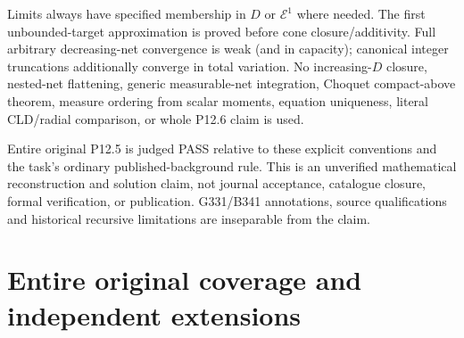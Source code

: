 \documentclass[
]{article}
\begin{document}
Limits always have specified membership in \(D\) or \(\mathcal E^1\)
where needed. The first unbounded-target approximation is proved before
cone closure/additivity. Full arbitrary decreasing-net convergence is
weak (and in capacity); canonical integer truncations additionally
converge in total variation. No increasing-\(D\) closure, nested-net
flattening, generic measurable-net integration, Choquet compact-above
theorem, measure ordering from scalar moments, equation uniqueness,
literal CLD/radial comparison, or whole P12.6 claim is used.

Entire original P12.5 is judged PASS relative to these explicit
conventions and the task's ordinary published-background rule. This is
an unverified mathematical reconstruction and solution claim, not
journal acceptance, catalogue closure, formal verification, or
publication. G331/B341 annotations, source qualifications and historical
recursive limitations are inseparable from the claim.

\section{Entire original coverage and independent
extensions}\label{entire-original-coverage-and-independent-extensions}
\end{document}

